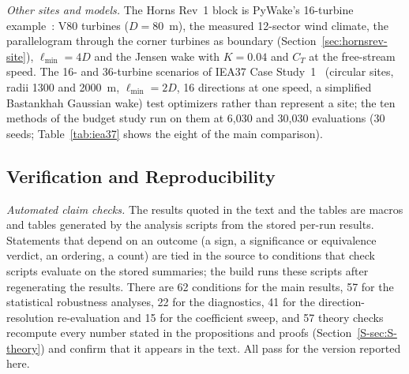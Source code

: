 \emph{Other sites and models.} The Horns Rev~1 block is PyWake's 16-turbine example~\cite{PyWake}: V80 turbines ($D=80$~m), the measured 12-sector wind climate, the parallelogram through the corner turbines as boundary (Section~\ref{sec:hornsrev-site}), $\ell_{\min}=4D$ and the Jensen wake with $K=0.04$ and $C_T$ at the free-stream speed.
The 16- and 36-turbine scenarios of IEA37 Case Study~1~\cite{Baker2019,IEA37repo} (circular sites, radii 1300 and 2000~m, $\ell_{\min}=2D$, 16 directions at one speed, a simplified Bastankhah Gaussian wake) test optimizers rather than represent a site; the ten methods of the budget study run on them at 6,030 and 30,030 evaluations (30 seeds; Table~\ref{tab:iea37} shows the eight of the main comparison).

\subsection{Verification and Reproducibility}
\label{sec:validation}
\emph{Automated claim checks.} The results quoted in the text and the tables are macros and tables generated by the analysis scripts from the stored per-run results. Statements that depend on an outcome (a sign, a significance or equivalence verdict, an ordering, a count) are tied in the source to conditions that check scripts evaluate on the stored summaries; the build runs these scripts after regenerating the results. There are 62 conditions for the main results, 57 for the statistical robustness analyses, 22 for the diagnostics, 41 for the direction-resolution re-evaluation and 15 for the coefficient sweep, and 57 theory checks recompute every number stated in the propositions and proofs (Section~\ref{S-sec:S-theory}) and confirm that it appears in the text. All pass for the version reported here.

